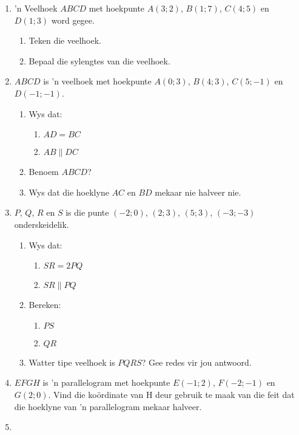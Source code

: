 \begin{eocexercises}{}
\begin{enumerate}[noitemsep, label=\textbf{\arabic*}. ]
\item 
 ’n Veelhoek
$ABCD$ met hoekpunte $A(3;2)$, $B(1;7)$, $C(4;5)$ en $D(1;3)$ word gegee.
    \begin{enumerate}[noitemsep, label=\textbf{\alph*}. ] 
    \item  Teken die veelhoek.
    \item  Bepaal die sylengtes van die veelhoek.
    \end{enumerate}
\item $ABCD$ is ’n veelhoek met hoekpunte $A(0;3)$, $B(4;3)$, $C(5;-1)$ en $D(-1;-1)$.
    \begin{enumerate}[noitemsep, label=\textbf{\alph*}. ] 
    \item Wys dat:
	\begin{enumerate}[noitemsep, label=\textbf{\roman*}. ] 
	\item $AD = BC$
	\item $AB \parallel DC$
	\end{enumerate}
    \item Benoem $ABCD$?
    \item Wys dat die hoeklyne $AC$ en $BD$ mekaar nie halveer nie.
    \end{enumerate}
\item $P$, $Q$, $R$ en $S$ is die punte $(-2;0)$, $(2;3)$, $(5;3)$, $(-3;-3)$ onderskeidelik.
    \begin{enumerate}[noitemsep, label=\textbf{\alph*}. ] 
    \item Wys dat:
	\begin{enumerate}[noitemsep, label=\textbf{\roman*}. ] 
	\item $SR = 2PQ$
	\item $SR \parallel PQ$
	\end{enumerate}
    \item Bereken:
	\begin{enumerate}[noitemsep, label=\textbf{\roman*}. ] 
	\item $PS$
	\item $QR$
	\end{enumerate}
    \item Watter tipe veelhoek is $PQRS$? Gee redes vir jou antwoord.
    \end{enumerate}
\item $EFGH$ is ’n parallelogram met hoekpunte $E(-1;2)$, $F(-2;-1)$ en $G(2;0)$. Vind die koördinate van H deur gebruik te maak van die feit dat die hoeklyne van ’n parallelogram mekaar halveer.\newline
\item  

\end{enumerate}
\end{eocexercises}
